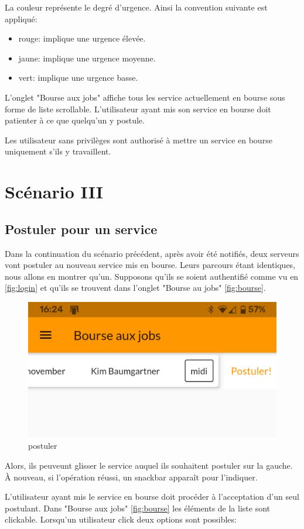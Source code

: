 La couleur représente le degré d'urgence. Ainsi la convention suivante est appliqué:
\begin{itemize}
    \item rouge: implique une urgence élevée.
    \item jaune: implique une urgence moyenne.
    \item vert: implique une urgence basse.
\end{itemize}

L'onglet "Bourse aux jobs" affiche tous les service actuellement en bourse sous
forme de liste scrollable. L'utilisateur ayant mis son service en bourse
doit patienter à ce que quelqu'un y postule.

Les utilisateur sans privilèges sont authorisé à mettre un service en bourse uniquement s'ils y travaillent.

\section[Postuler pour un service - Scénario III]{Scénario III}
    \subsection*{Postuler pour un service}
    Dans la continuation du scénario précédent, après avoir été notifiés,
    deux serveurs vont postuler au nouveau service mis
    en bourse. Leurs parcours étant identiques, nous allons en montrer qu'un.
    Supposons qu'ils se soient authentifié comme vu en \ref{fig:login} et qu'ils se trouvent
    dans l'onglet "Bourse au jobs" \ref{fig:bourse}.

    \begin{figure}[h]
        \centering
        \includegraphics[width=.3\linewidth]{screenshots/scenario_03/postuler.png}
        \caption{postuler}
        \label{fig:postuler}
    \end{figure}

    Alors, ils peuveunt glisser le service auquel ils souhaitent postuler sur
    la gauche. À nouveau, si l'opération réussi, un snackbar apparaît pour l'indiquer.

    L'utilisateur ayant mis le service en bourse doit procéder à l'acceptation
    d'un seul postulant. Dans "Bourse aux jobs" \ref{fig:bourse} les éléments de 
    la liste sont clickable. Lorsqu'un utilisateur click deux options sont possibles:

